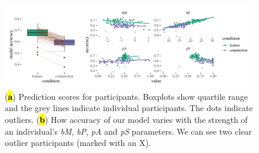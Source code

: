 \documentclass[vision,article,accept,pdftex,moreauthors]{Definitions/mdpi}
\begin{document}
\begin{figure}[H]
\includegraphics[width=13.5 cm]{Figures/qjep_indiv_diff.pdf}
\caption{({\textbf{\hl{a}}}) Prediction scores for participants. Boxplots show quartile range and the grey lines indicate individual participants. The dots indicate outliers. (\textbf{\hl{b}}) How accuracy of our model varies with the strength of an individual’s \textit{bM}, \textit{bP}, \textit{pA} and \textit{pS} parameters. We can see two clear outlier participants (marked with an X).} %

\label{fig:cal2}
\end{figure}   
\vspace{-12pt}
\end{document}

